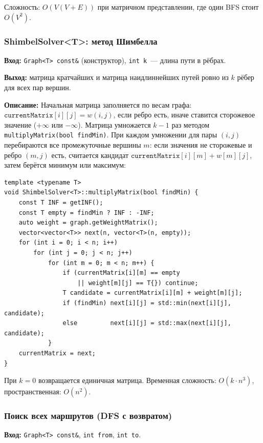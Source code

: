 Сложность: $O(V(V + E))$ при матричном представлении, где один BFS
стоит $O(V^2)$.

\subsubsection{ShimbelSolver\textless T\textgreater: метод Шимбелла}

\textbf{Вход:} \texttt{Graph<T> const\&} (конструктор), \texttt{int k}~---
длина пути в рёбрах.

\textbf{Выход:} матрица кратчайших и матрица наидлиннейших путей
ровно из $k$ рёбер для всех пар вершин.

\textbf{Описание:} Начальная матрица заполняется по весам графа:
$\texttt{currentMatrix}[i][j] = w(i,j)$, если ребро есть, иначе
ставится сторожевое значение ($+\infty$ или $-\infty$).
Матрица умножается $k - 1$ раз методом \texttt{multiplyMatrix(bool findMin)}.
При каждом умножении для пары $(i, j)$ перебираются все промежуточные вершины $m$:
если значения не сторожевые и ребро $(m, j)$ есть, считается кандидат
$\texttt{currentMatrix}[i][m] + w[m][j]$, затем берётся минимум или максимум:

\begin{lstlisting}[style=cstyle, caption={Матричное умножение для метода Шимбелла (shimbel.cpp)}]
template <typename T>
void ShimbelSolver<T>::multiplyMatrix(bool findMin) {
    const T INF = getINF();
    const T empty = findMin ? INF : -INF;
    auto weight = graph.getWeightMatrix();
    vector<vector<T>> next(n, vector<T>(n, empty));
    for (int i = 0; i < n; i++)
        for (int j = 0; j < n; j++)
            for (int m = 0; m < n; m++) {
                if (currentMatrix[i][m] == empty
                    || weight[m][j] == T{}) continue;
                T candidate = currentMatrix[i][m] + weight[m][j];
                if (findMin) next[i][j] = std::min(next[i][j], candidate);
                else         next[i][j] = std::max(next[i][j], candidate);
            }
    currentMatrix = next;
}
\end{lstlisting}

При $k = 0$ возвращается единичная матрица.
Временная сложность: $O(k \cdot n^3)$, пространственная: $O(n^2)$.

\subsubsection{Поиск всех маршрутов (DFS с возвратом)}

\textbf{Вход:} \texttt{Graph<T> const\&}, \texttt{int from}, \texttt{int to}.

